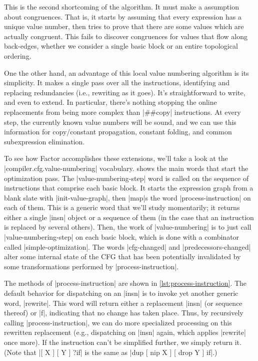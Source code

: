 This is the second shortcoming of the algorithm.  It must make a
 assumption about congruences.  That is, it starts by
assuming that every expression has a unique value number, then tries to prove
that there are some values which are actually congruent.  This fails to
discover congruences for values that flow along back-edges, whether we consider
a single basic block or an entire topological ordering.

One the other hand, an advantage of this local value numbering algorithm is its
simplicity.  It makes a single pass over all the instructions, identifying and
replacing redundancies  (i.e., rewriting as it goes).  It's
straightforward to write, and even to extend.  In particular, there's nothing
stopping the online replacements from being more complex than \factor|##copy|
instructions.  At every step, the currently known value numbers will be sound,
and we can use this information for copy/constant propagation, constant
folding, and common subexpression elimination.


To see how Factor accomplishes these extensions, we'll take a look at the
\factor|compiler.cfg.value-numbering| vocabulary.
 shows the main words that start the
optimization pass.  The \factor|value-numbering-step| word is called on the
sequence of instructions that comprise each basic block.  It starts the
expression graph from a blank slate with \factor|init-value-graph|, then
\factor|map|s the word \factor|process-instruction| on each of them.  This is a
generic word that we'll study momentarily; it returns either a single
\factor|insn| object or a sequence of them (in the case that an instruction is
replaced by several others).  Then, the work of \factor|value-numbering| is to
just call \factor|value-numbering-step| on each basic block, which is done with
a combinator called \factor|simple-optimization|.  The words
\factor|cfg-changed| and \factor|predecessors-changed| alter some internal
state of the \gls{CFG} that has been potentially invalidated by some
transformations performed by \factor|process-instruction|.


The methods of \factor|process-instruction| are shown in
\vref{lst:process-instruction}.  The default behavior for dispatching on an
\factor|insn| is to invoke yet another generic word,
\factor|rewrite|.  This word will return either a replacement \factor|insn| (or
sequence thereof) or \factor|f|, indicating that no change has taken place.
Thus, by recursively calling \factor|process-instruction|, we can do more
specialized processing on this rewritten replacement (e.g., dispatching on
\factor|insn| again, which applies \factor|rewrite| once more).  If the
instruction can't be simplified further, we simply return it.  (Note that
%
\factor|[ X ] [ Y ] ?if|
%
is the same as
%
\factor|dup [ nip X ] [ drop Y ] if|.)

